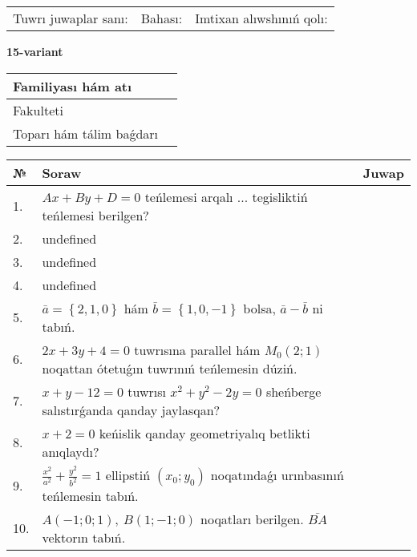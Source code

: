 \documentclass{article}
\begin{document}
\vspace{0.7cm}

\begin{tabular}{lll}
Tuwrı juwaplar sanı: \underline{\hspace{1cm}} & 
Bahası: \underline{\hspace{1cm}} & 
Imtixan alıwshınıń qolı: \underline{\hspace{2cm}} \\
\end{tabular}

\egroup

\newpage


\textbf{15-variant}\\

\bgroup
\def\arraystretch{1.6} %

\begin{tabular}{|m{5.7cm}|m{9.5cm}|}
\hline
Familiyası hám atı & \\
\hline
Fakulteti  & \\
\hline
Toparı hám tálim baǵdarı  & \\
\hline
\end{tabular}

\vspace{0.7cm}

\begin{tabular}{|m{0.7cm}|m{10cm}|m{4cm}|}
\hline
№ & Soraw & Juwap \\
\hline
1. & \(Ax + By + D = 0\) teńlemesi arqalı ... tegisliktiń teńlemesi berilgen? &  \\
\hline
2. & undefined &  \\
\hline
3. & undefined &  \\
\hline
4. & undefined &  \\
\hline
5. & \(\bar{a} = \left\{ 2, 1, 0 \right\}\) hám \(\bar{b} = \left\{ 1, 0,- 1 \right\}\) bolsa, \(\bar{a} - \bar{b}\) ni tabıń. &  \\
\hline
6. & \(2 x + 3 y + 4 = 0\) tuwrısına parallel hám \(M_{0} (2;1)\) noqattan ótetuǵın tuwrınıń teńlemesin dúziń. &  \\
\hline
7. & \(x + y - 12 = 0\) tuwrısı \(x^{2} + y^{2} - 2 y = 0\) sheńberge salıstırǵanda qanday jaylasqan? &  \\
\hline
8. & \(x + 2 = 0\) keńislik qanday geometriyalıq betlikti anıqlaydı? &  \\
\hline
9. & \(\frac{x^{2}}{a^{2}} + \frac{y^{2}}{b^{2}} = 1\) ellipstiń \((x_{0};y_{0})\) noqatındaǵı urınbasınıń teńlemesin tabıń. &  \\
\hline
10. & \(A (- 1;0;1),\ B (1; - 1;0)\) noqatları berilgen. \(\bar{BA}\) vektorın tabıń. & \\
\hline
\end{tabular}
\end{document}
